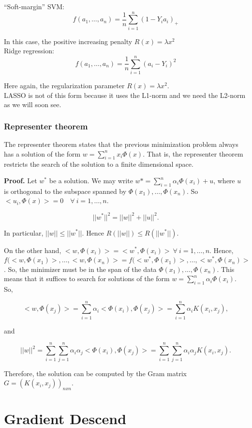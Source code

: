 \documentclass[11pt, english]{article}
\begin{document}
``Soft-margin'' SVM:
$$
f(a_1,\dots,a_n) = \frac{1}{n} \sum_{i=1}^{n}(1 - Y_ia_i)_+
$$

In this case, the positive increasing penalty $R(x) = \lambda x^2$\\

Ridge regression:
$$
f(a_1, \dots, a_n) = \frac{1}{n} \sum_{i=1}^{n}(a_i - Y_i)^2
$$

Here again, the regularization parameter $R(x) = \lambda x^2$.\\

LASSO is not of this form because it uses the L1-norm and we need the L2-norm as we will soon see.

\subsubsection{Representer theorem}%

The representer theorem states that the previous minimization problem always has a solution of the form $w = \sum_{i=1}^{n} x_i \Phi(x)$. That is, the representer theorem restricts the search of the solution to a finite dimensional space.

\textbf{Proof.} Let $w^*$ be a solution. We may write $w* = \sum_{i=1}^{n}\alpha_i \Phi(x_i) + u$, where $u$ is orthogonal to the subspace spanned by $\Phi(x_1),\dots, \Phi(x_n)$. So $<u_i, \Phi(x)> = 0 \quad \forall \ i=1,\dots,n$.

\begin{equation}
||w^*||^2 = ||w||^2 + ||u||^2.
\end{equation}


In particular, $||w|| \leq ||w^*||$. Hence $R(||w||) \leq R(||w^*||).$

On the other hand, $<w,\Phi(x_i)> = <w^*, \Phi(x_i)> \ \forall \ i = 1,\dots, n$. Hence, $f(<w,\Phi(x_1)>, \dots, <w, \Phi (x_n)> = f(<w^*,\Phi(x_1)>, \dots, <w^*, \Phi (x_n)>$. So, the minimizer must be in the span of the data $\Phi(x_1), \dots, \Phi(x_n)$. This means that it suffices to search for solutions of the form $w = \sum_{i=1}^{n}\alpha_i \Phi(x_i)$. So,

\begin{equation}
<w,\Phi(x_j)> = \sum_{i=1}^{n} \alpha_i <\Phi(x_i), \Phi(x_j)> = \sum_{i=1}^{n}\alpha_i K(x_i, x_j),
\end{equation}

and

\begin{equation}
||w||^2 = \sum_{i=1}^{n} \sum_{j=1}^{n} \alpha_i \alpha_j <\Phi(x_i), \Phi(x_j)> = \sum_{i=1}^{n}\sum_{j=1}^{n} \alpha_i \alpha_j K(x_i, x_j).
\end{equation}

Therefore, the solution can be computed by the Gram matrix $G = (K(x_i,x_j))_{nxn}$.


\section{Gradient Descend}

 
\end{document}

